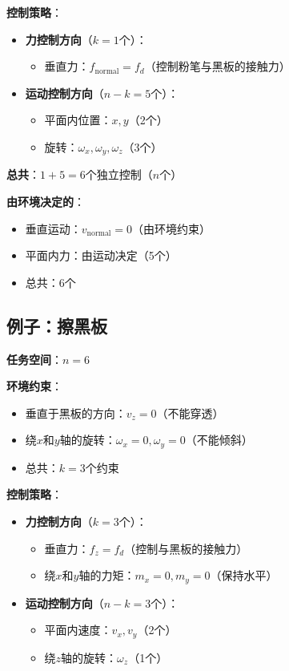 \documentclass[12pt,a4paper]{article}
\begin{document}
\textbf{控制策略}：
\begin{itemize}
\item \textbf{力控制方向}（$k = 1$个）：
\begin{itemize}
\item 垂直力：$f_{\text{normal}} = f_d$（控制粉笔与黑板的接触力）
\end{itemize}
\item \textbf{运动控制方向}（$n-k = 5$个）：
\begin{itemize}
\item 平面内位置：$x, y$（2个）
\item 旋转：$\omega_x, \omega_y, \omega_z$（3个）
\end{itemize}
\end{itemize}

\textbf{总共}：$1 + 5 = 6$个独立控制（$n$个）

\textbf{由环境决定的}：
\begin{itemize}
\item 垂直运动：$v_{\text{normal}} = 0$（由环境约束）
\item 平面内力：由运动决定（5个）
\item 总共：$6$个
\end{itemize}

\subsection{例子：擦黑板}

\textbf{任务空间}：$n = 6$

\textbf{环境约束}：
\begin{itemize}
\item 垂直于黑板的方向：$v_z = 0$（不能穿透）
\item 绕$x$和$y$轴的旋转：$\omega_x = 0, \omega_y = 0$（不能倾斜）
\item 总共：$k = 3$个约束
\end{itemize}

\textbf{控制策略}：
\begin{itemize}
\item \textbf{力控制方向}（$k = 3$个）：
\begin{itemize}
\item 垂直力：$f_z = f_d$（控制与黑板的接触力）
\item 绕$x$和$y$轴的力矩：$m_x = 0, m_y = 0$（保持水平）
\end{itemize}
\item \textbf{运动控制方向}（$n-k = 3$个）：
\begin{itemize}
\item 平面内速度：$v_x, v_y$（2个）
\item 绕$z$轴的旋转：$\omega_z$（1个）
\end{itemize}
\end{itemize}
\end{document}
